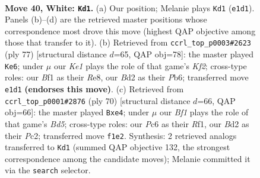 \documentclass[11pt]{article}
\begin{document}
\clearpage

\begin{figure}[p]\centering
\begin{subfigure}{0.46\textwidth}\centering
\resizebox{\linewidth}{!}{%
\newchessgame
\chessboard[
  setfen={1r2n1R1/p1p1k3/2P2p2/8/4rP1p/1P6/3B3P/4KBR1 w - - 4 40},
  showmover=false,
  pgfstyle=straightmove, color=movearrow, markmove={e1-d1}
]}
\caption{}
\end{subfigure}\hfill
\begin{subfigure}{0.46\textwidth}\centering
\resizebox{\linewidth}{!}{%
\newchessgame
\chessboard[
  setfen={4r3/p1R2k2/1p3b1p/3r3P/3p2p1/5NP1/PP1R1P2/5K2 b - - 1 39},
  showmover=false,
  pgfstyle=straightmove, color=movearrow, markmove={f7-e6}
]}
\caption{}
\end{subfigure}
\\[4pt]
\begin{subfigure}{0.46\textwidth}\centering
\resizebox{\linewidth}{!}{%
\newchessgame
\chessboard[
  setfen={8/4k2r/3p3P/3Bppr1/p3n3/P1K1P3/2P5/5R1R w - - 2 36},
  showmover=false,
  pgfstyle=straightmove, color=movearrow, markmove={d5-e4}
]}
\caption{}
\end{subfigure}\hfill

\caption{\textbf{Move 40, White: \texttt{Kd1}.} (a) Our position; Melanie plays \texttt{Kd1} (\texttt{e1d1}). Panels (b)--(d) are the retrieved master positions whose correspondence most drove this move (highest QAP objective among those that transfer to it). (b) Retrieved from \texttt{ccrl\_top\_p0003\#2623} (ply 77) [structural distance $d$=65, QAP obj=78]: the master played \texttt{Ke6}; under $\mu$ our \emph{Ke1} plays the role of that game's \emph{Kf2}; cross-type roles: our \emph{B}f1 as their \emph{R}e8, our \emph{B}d2 as their \emph{P}b6; transferred move \texttt{e1d1} \textbf{(endorses this move)}. (c) Retrieved from \texttt{ccrl\_top\_p0001\#2876} (ply 70) [structural distance $d$=66, QAP obj=66]: the master played \texttt{Bxe4}; under $\mu$ our \emph{Bf1} plays the role of that game's \emph{Bd5}; cross-type roles: our \emph{P}c6 as their \emph{R}f1, our \emph{B}d2 as their \emph{P}c2; transferred move \texttt{f1e2}. Synthesis: 2 retrieved analogs transferred to \texttt{Kd1} (summed QAP objective 132, the strongest correspondence among the candidate moves); Melanie committed it via the \texttt{search} selector.}
\label{fig:thought-m78}
\end{figure}

\clearpage
\end{document}
